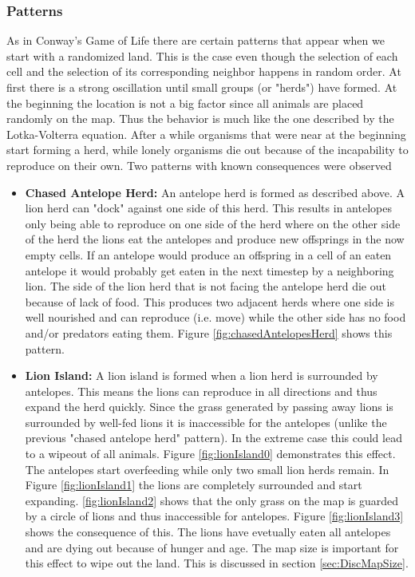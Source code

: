 \documentclass[11pt]{article}
\begin{document}
\subsubsection{Patterns}
\label{sec:patterns}
As in Conway's Game of Life there are certain patterns that appear when we start with a randomized land. This is the case even though the selection of each cell and the selection of its corresponding neighbor happens in random order.  At first there is a strong oscillation until small groups (or "herds") have formed. At the beginning the location is not a big factor since all animals are placed randomly on the map. Thus the behavior is much like the one described by the Lotka-Volterra equation. After a while organisms that were near at the beginning start forming a herd, while lonely organisms die out because of the incapability to reproduce on their own. 
Two patterns with known consequences were observed
\begin{itemize}
\item {\bf Chased Antelope Herd:} An antelope herd is formed as described above. A lion herd can "dock" against one side of this herd. This results in antelopes only being able to reproduce on one side of the herd where on the other side of the herd the lions eat the antelopes and produce new offsprings in the now empty cells. If an antelope would produce an offspring in a cell of an eaten antelope it would probably get eaten in the next timestep by a neighboring lion. The side of the lion herd that is not facing the antelope herd die out because of lack of food. This produces two adjacent herds where one side is well nourished and can reproduce (i.e. move) while the other side has no food and/or predators eating them. Figure \ref{fig:chasedAntelopesHerd} shows this pattern.
\item {\bf Lion Island:} A lion island is formed when a lion herd is surrounded by antelopes. This means the lions can reproduce in all directions and thus expand the herd quickly. Since the grass generated by passing away lions is surrounded by well-fed lions it is inaccessible for the antelopes (unlike the previous "chased antelope herd" pattern). In the extreme case this could lead to a wipeout of all animals. Figure \ref{fig:lionIsland0} demonstrates this effect. The antelopes start overfeeding while only two small lion herds remain. In Figure \ref{fig:lionIsland1} the lions are completely surrounded and start expanding. \ref{fig:lionIsland2} shows that the only grass on the map is guarded by a circle of lions and thus inaccessible for antelopes. Figure \ref{fig:lionIsland3} shows the consequence of this. The lions have evetually eaten all antelopes and are dying out because of hunger and age. The map size is important for this effect to wipe out the land. This is discussed in section \ref{sec:DiscMapSize}.
\end{itemize}
\end{document}

